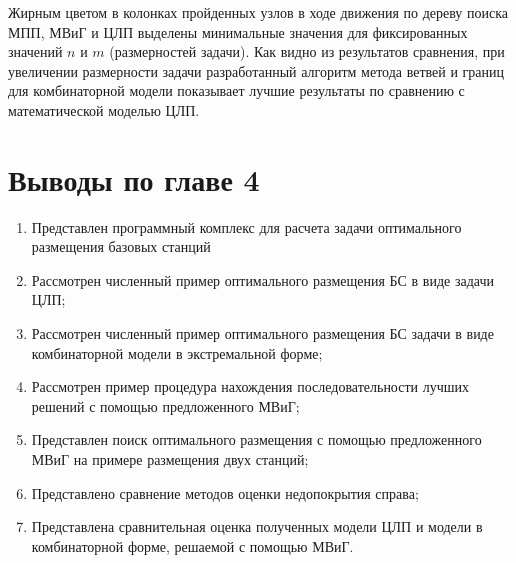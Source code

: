 Жирным цветом в колонках пройденных узлов в ходе движения по дереву поиска МПП, МВиГ и ЦЛП выделены минимальные значения для фиксированных значений $n$ и $m$ (размерностей задачи). Как видно из результатов сравнения, при увеличении размерности задачи разработанный алгоритм метода ветвей и границ для комбинаторной модели показывает лучшие результаты по сравнению с математической моделью ЦЛП.
\section{Выводы по главе 4}

\begin{enumerate}
  \item Представлен программный комплекс для расчета задачи оптимального размещения базовых станций
  \item Рассмотрен численный пример оптимального размещения БС в виде задачи ЦЛП;
  \item Рассмотрен численный пример оптимального размещения БС задачи  в виде комбинаторной модели в экстремальной форме;
  \item Рассмотрен пример процедура нахождения последовательности лучших решений с помощью предложенного МВиГ;
  \item Представлен поиск оптимального размещения с помощью предложенного МВиГ на примере размещения двух станций;
  \item Представлено сравнение методов оценки недопокрытия справа;
  \item Представлена сравнительная оценка полученных модели ЦЛП и модели в комбинаторной форме, решаемой с помощью МВиГ.
\end{enumerate}
